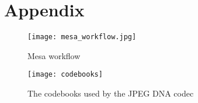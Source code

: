 
\chapter{Appendix}

\begin{figure}[htb]
    \centering
    \texttt{[image: mesa\_workflow.jpg]}
    \caption{Mesa workflow}
    \label{fig:mesa_workflow}
\end{figure}

% 

\begin{figure}
    \centering
    \texttt{[image: codebooks]}
    \caption{The codebooks used by the JPEG DNA codec }
    \label{fig:codebooks}
\end{figure}
